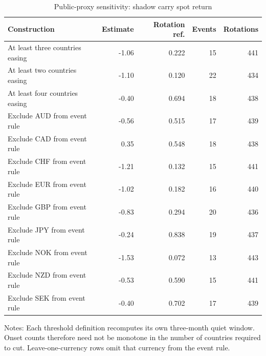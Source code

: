 \begin{table}[H]
\centering
\caption{Public-proxy sensitivity: shadow carry spot return}
\label{tab:public_proxy_sensitivity}
\small
\begin{tabular}{lrrrr}
\toprule
Construction & Estimate & Rotation ref. & Events & Rotations \\
\midrule
At least three countries easing & -1.06 & 0.222 & 15 & 441 \\
At least two countries easing & -1.10 & 0.120 & 22 & 434 \\
At least four countries easing & -0.40 & 0.694 & 18 & 438 \\
Exclude AUD from event rule & -0.56 & 0.515 & 17 & 439 \\
Exclude CAD from event rule & 0.35 & 0.548 & 18 & 438 \\
Exclude CHF from event rule & -1.21 & 0.132 & 15 & 441 \\
Exclude EUR from event rule & -1.02 & 0.182 & 16 & 440 \\
Exclude GBP from event rule & -0.83 & 0.294 & 20 & 436 \\
Exclude JPY from event rule & -0.24 & 0.838 & 19 & 437 \\
Exclude NOK from event rule & -1.53 & 0.072 & 13 & 443 \\
Exclude NZD from event rule & -0.53 & 0.590 & 15 & 441 \\
Exclude SEK from event rule & -0.40 & 0.702 & 17 & 439 \\
\bottomrule
\end{tabular}
\begin{minipage}{0.92\linewidth}\footnotesize Notes: Each threshold definition recomputes its own three-month quiet window. Onset counts therefore need not be monotone in the number of countries required to cut. Leave-one-currency rows omit that currency from the event rule.\end{minipage}
\end{table}
